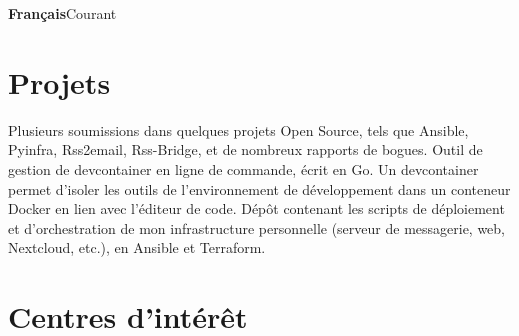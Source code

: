 \documentclass[10pt,a4paper,roman]{moderncv}
\begin{document}
    {\textbf{Français}}{Courant}

\section{Projets}

    {Plusieurs soumissions dans quelques projets Open Source, tels que Ansible, Pyinfra, Rss2email, Rss-Bridge, et de nombreux rapports de bogues.}
    {Outil de gestion de devcontainer en ligne de commande, écrit en Go. Un devcontainer permet d'isoler les outils de l'environnement de développement dans un conteneur Docker en lien avec l'éditeur de code.}
    {Dépôt contenant les scripts de déploiement et d'orchestration de mon infrastructure personnelle (serveur de messagerie, web, Nextcloud, etc.), en Ansible et Terraform.}

\section{Centres d'intérêt}

\end{document}
